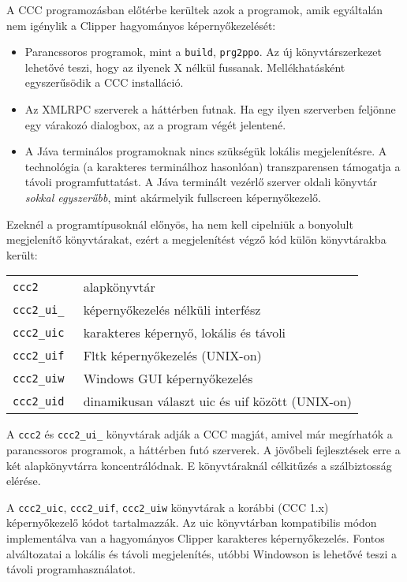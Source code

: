 A CCC programozásban előtérbe kerültek azok a programok,
amik egyáltalán nem igénylik a Clipper hagyományos képernyőkezelését:
\begin{itemize}
\item 
  Parancssoros programok, mint a \verb!build!, \verb!prg2ppo!.
  Az új könyvtárszerkezet lehetővé teszi, hogy az ilyenek X nélkül 
  fussanak. Mellékhatásként egyszerűsödik a CCC installáció.
\item
  Az XMLRPC szerverek a háttérben futnak.
  Ha egy ilyen szerverben feljönne egy várakozó dialogbox, 
  az a program végét jelentené.
\item 
  A Jáva terminálos programoknak nincs szükségük
  lokális megjelenítésre.  A technológia (a karakteres
  terminálhoz hasonlóan) transzparensen támogatja a távoli 
  programfuttatást. A Jáva terminált vezérlő szerver oldali könyvtár
  {\em sokkal egyszerűbb}, mint akármelyik fullscreen képernyőkezelő.
\end{itemize}
Ezeknél a programtípusoknál előnyös, ha nem kell cipelniük
a bonyolult megjelenítő könyvtárakat, ezért a megjelenítést 
végző kód külön könyvtárakba került:

\begin{tabular}{ll}
\tt ccc2       &  alapkönyvtár \\
\tt ccc2\_ui\_ &  képernyőkezelés nélküli interfész\\
\tt ccc2\_uic  &  karakteres képernyő, lokális és távoli\\
\tt ccc2\_uif  &  Fltk képernyőkezelés (UNIX-on)\\
\tt ccc2\_uiw  &  Windows GUI képernyőkezelés\\
\tt ccc2\_uid  &  dinamikusan választ uic és uif között (UNIX-on)\\
\end{tabular}

A \verb!ccc2! és \verb!ccc2_ui_! könyvtárak adják a CCC magját, amivel 
már megírhatók a parancssoros programok, a háttérben futó szerverek.
A jövőbeli fejlesztések erre a két alapkönyvtárra koncentrálódnak. 
E könyvtáraknál célkitűzés a szálbiztosság elérése.

A \verb!ccc2_uic!, \verb!ccc2_uif!, \verb!ccc2_uiw! könyvtárak 
a korábbi (CCC 1.x) képernyőkezelő kódot tartalmazzák. Az uic
könyvtárban kompatibilis módon implementálva van a hagyományos Clipper 
karakteres képernyőkezelés. Fontos alváltozatai a lokális és
távoli megjelenítés, utóbbi Windowson is lehetővé teszi a 
távoli programhasználatot.

